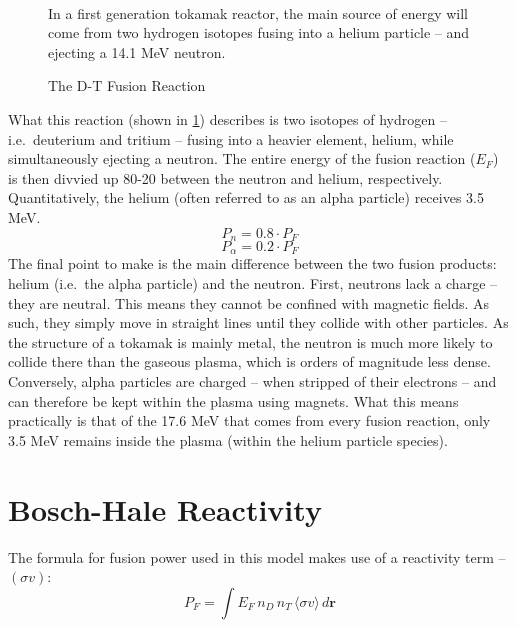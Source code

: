 \begin{figure}
	\centering
	\begin{adjustbox}{width=0.75\textwidth}
		
	\end{adjustbox}
	\caption{The D-T Fusion Reaction} ~\\
	\small In a first generation tokamak reactor, the main source of energy will come from two hydrogen isotopes fusing into a helium particle -- and ejecting a 14.1 MeV neutron.
	\label{fig:fusion_reaction}
\end{figure}

What this reaction (shown in \cref{fig:fusion_reaction}) describes is two isotopes of hydrogen -- i.e.\ deuterium and tritium -- fusing into a heavier element, helium, while simultaneously ejecting a neutron. The entire energy of the fusion reaction ($E_F$) is then divvied up 80-20 between the neutron and helium, respectively. Quantitatively, the helium (often referred to as an alpha particle) receives 3.5 MeV.
\begin{equation}
	P_n = 0.8 \cdot P_F
\end{equation}
\begin{equation}
	P_\alpha = 0.2 \cdot P_F
\end{equation}
The final point to make is the main difference between the two fusion products: helium (i.e.\ the alpha particle) and the neutron. First, neutrons lack a charge -- they are neutral. This means they cannot be confined with magnetic fields. As such, they simply move in straight lines until they collide with other particles. As the structure of a tokamak is mainly metal, the neutron is much more likely to collide there than the gaseous plasma, which is orders of magnitude less dense. Conversely, alpha particles are charged -- when stripped of their electrons -- and can therefore be kept within the plasma using magnets. What this means practically is that of the 17.6 MeV that comes from every fusion reaction, only 3.5 MeV remains inside the plasma (within the helium particle species).

\section{Bosch-Hale Reactivity}

The formula for fusion power used in this model makes use of a reactivity term -- $(\sigma v)$:\cite{jeff}
\begin{equation}
	P_F = \int E_F \, n_D \, n_T \, \langle \sigma v \rangle \, d \textbf{r}
\end{equation}


